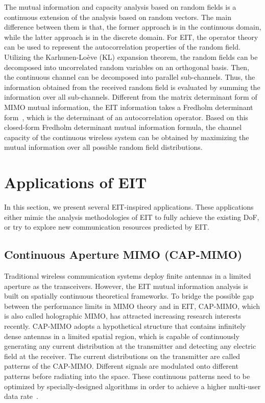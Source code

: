 \documentclass[journal,twocolumn]{IEEEtran}
\begin{document}
The mutual information and capacity analysis based on random fields is a continuous extension of the analysis based on random vectors. 
The main difference between them is that, the former approach is in the continuous domain, while the latter approach is in the discrete domain. 
For EIT, the operator theory can be used to represent the autocorrelation properties of the random field. 
Utilizing the Karhunen-Lo\`{e}ve (KL) expansion theorem, the random fields can be decomposed into uncorrelated random variables on an orthogonal basis. 
Then, the continuous channel can be decomposed into parallel sub-channels. 
Thus, the information obtained from the received random field is evaluated by summing the information over all sub-channels. 
Different from the matrix determinant form of MIMO mutual information, the EIT information takes a Fredholm determinant form~\cite{wan2022mutual}, which is the determinant of an autocorrelation operator. 
Based on this closed-form Fredholm determinant mutual information formula, the channel capacity of the continuous wireless system can be obtained by maximizing the mutual information over all possible random field distributions. 


\section{Applications of EIT}
In this section, we present several EIT-inspired applications. 
These applications either mimic the analysis methodologies of EIT to fully achieve the existing DoF, or try to explore new communication resources predicted by EIT. 

\subsection{Continuous Aperture MIMO (CAP-MIMO)}
Traditional wireless communication systems deploy finite antennas in a limited aperture as the transceivers. 
However, the EIT mutual information analysis is built on spatially continuous theoretical frameworks. 
To bridge the possible gap between the performance limits in MIMO theory and in EIT, CAP-MIMO, which is also called holographic MIMO, has attracted increasing research interests recently. 
CAP-MIMO adopts a hypothetical structure that contains infinitely dense antennas in a limited spatial region, which is capable of continuously generating any current distribution at the transmitter and detecting any electric field at the receiver.  
The current distributions on the transmitter are called patterns of the CAP-MIMO. 
Different signals are modulated onto different patterns before radiating into the space. 
These continuous patterns need to be optimized by specially-designed algorithms in order to achieve a higher multi-user data rate~\cite{zhang2022pdma}. 
\end{document}

